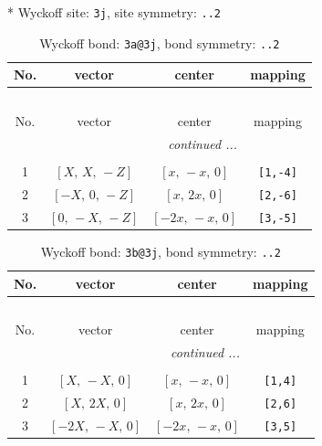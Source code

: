 \documentclass[fleqn,8pt]{jsarticle}
\begin{document}
* Wyckoff site: {\tt 3j}, site symmetry: {\tt ..2}
\renewcommand{\arraystretch}{1.2}
\begin{longtable}{cccc}
\caption{Wyckoff bond: {\tt 3a@3j}, bond symmetry: {\tt ..2}}
 \\
 \hline \hline
No. & vector & center & mapping \\ \hline \endfirsthead

\multicolumn{3}{l}{\tablename\ \thetable{}} \\
 \hline \hline
No. & vector & center & mapping \\ \hline \endhead

 \hline \hline
\multicolumn{3}{r}{\footnotesize\it continued ...} \\ \endfoot

 \hline \hline
\multicolumn{3}{r}{} \\ \endlastfoot

1 & $\left[ X,\, X,\, - Z \right]$ & $\left[ x,\, - x,\, 0 \right]$ & {\tt [1,-4]} \\ \hline
2 & $\left[ - X,\, 0,\, - Z \right]$ & $\left[ x,\, 2 x,\, 0 \right]$ & {\tt [2,-6]} \\ \hline
3 & $\left[ 0,\, - X,\, - Z \right]$ & $\left[ - 2 x,\, - x,\, 0 \right]$ & {\tt [3,-5]} \\
\end{longtable}
\renewcommand{\arraystretch}{1.2}
\begin{longtable}{cccc}
\caption{Wyckoff bond: {\tt 3b@3j}, bond symmetry: {\tt ..2}}
 \\
 \hline \hline
No. & vector & center & mapping \\ \hline \endfirsthead

\multicolumn{3}{l}{\tablename\ \thetable{}} \\
 \hline \hline
No. & vector & center & mapping \\ \hline \endhead

 \hline \hline
\multicolumn{3}{r}{\footnotesize\it continued ...} \\ \endfoot

 \hline \hline
\multicolumn{3}{r}{} \\ \endlastfoot

1 & $\left[ X,\, - X,\, 0 \right]$ & $\left[ x,\, - x,\, 0 \right]$ & {\tt [1,4]} \\ \hline
2 & $\left[ X,\, 2 X,\, 0 \right]$ & $\left[ x,\, 2 x,\, 0 \right]$ & {\tt [2,6]} \\ \hline
3 & $\left[ - 2 X,\, - X,\, 0 \right]$ & $\left[ - 2 x,\, - x,\, 0 \right]$ & {\tt [3,5]} \\
\end{longtable}
\end{document}
